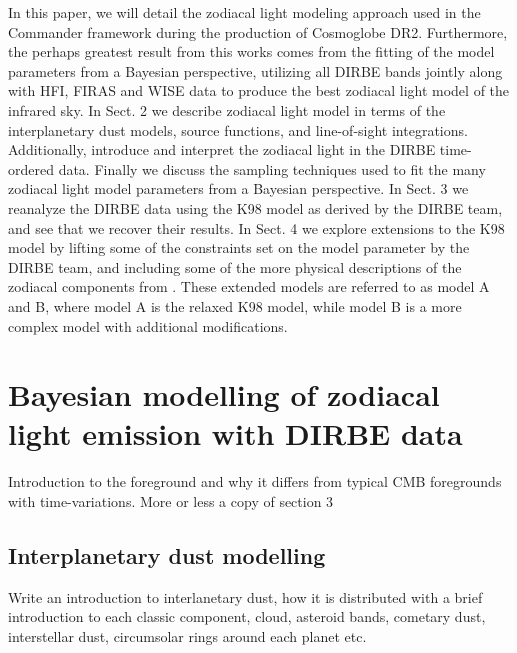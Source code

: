 \documentclass{aa}
\begin{document}
In this paper, we will detail the zodiacal light modeling approach used in the Commander framework during the production of Cosmoglobe DR2. Furthermore, the perhaps greatest result from this works comes from the fitting of the model parameters from a Bayesian perspective, utilizing all DIRBE bands jointly along with HFI, FIRAS and WISE data to produce the best zodiacal light model of the infrared sky. In Sect. 2 we describe zodiacal light model in terms of the interplanetary dust models, source functions, and line-of-sight integrations. 
Additionally, introduce and interpret the zodiacal light in the DIRBE time-ordered data. Finally we discuss the sampling techniques used to fit the many zodiacal light model parameters from a Bayesian perspective. In Sect. 3 we reanalyze the DIRBE data using the K98 model as derived by the DIRBE team, and see that we recover their results. In Sect. 4 we explore extensions to the K98 model by lifting some of the constraints set on the model parameter by the DIRBE team, and including some of the more physical descriptions of the zodiacal components from \cite{RRM}. These extended models are referred to as model A and B, where model A is the relaxed K98 model, while model B is a more complex model with additional modifications.


\clearpage
\section{Bayesian modelling of zodiacal light emission with DIRBE data}
Introduction to the foreground and why it differs from typical CMB foregrounds with time-variations. More or less a copy of \cite{ZODIPY} section 3



\subsection{Interplanetary dust modelling}
Write an introduction to interlanetary dust, how it is distributed with a brief introduction to each classic component, cloud, asteroid bands, cometary dust, interstellar dust, circumsolar rings around each planet etc.
\end{document}
